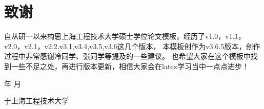 \chapter*{致谢}
\pagestyle{plain}
自从研一以来构思上海工程技术大学硕士学位论文模板，经历了v1.0，v1.1，v2.0，v2.1，v2.2,v3.1,v3.4,v3.5,v3.6这几个版本，
本模板创作为v3.6.5版本，创作过程中非常感谢冷同学、张同学等提及的一些建议。
也希望大家在这个模板中找到一些不足之处，再进行版本更新，相信大家会在latex学习当中一点点进步！

\vspace{0.56\textheight}

\begin{flushright}
    \number\year  年 \number\month  月
    
    于上海工程技术大学
\end{flushright}

